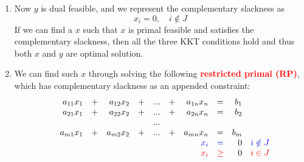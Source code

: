 \documentclass[mathserif]{beamer}
\begin{document}
{\begin{itemize}
\begin{small}
\begin{enumerate}
 \begin{figure}
 \texttt{[image: L9-RP.png]}
\end{figure}
\item Now $y$ is dual feasible, and we represent the complementary slackness as
\[
	x_i = 0, \quad  i \notin J
\]
If we can find a $x$ such that $x$ is primal feasible and satisfies the complementary slackness, then all the three KKT conditions hold and thus both $x$ and $y$ are optimal solution. 
\item We can find such $x$ through solving the following  \textcolor{red}{\bf restricted primal (RP)}, which has  complementary slackness as an appended constraint: 
\[
\begin{array}{rrrrrrrrrrrrl}
      & a_{11}x_1 &+& a_{12}x_2 &+& ... &+& a_{1n}x_n & = & b_1 &  \\
      & a_{21}x_1 &+& a_{22}x_2 &+& ... &+& a_{2n}x_n & = & b_2 & \\
      &           & &           & & ... & &           &      &     &  \\
      & a_{m1}x_1 &+& a_{m2}x_2 &+& ... &+& a_{mn}x_n & = & b_m & \\
      &           & &           & &     & &       \textcolor{blue}{x_i} & \textcolor{blue}{=} & 0   &\textcolor{blue}{ i\notin J} \\
      &           & &           & &     & &       \textcolor{red}{x_i} & \textcolor{red}{\geq} & 0   & \textcolor{red}{i\in J} 
     \end{array} \nonumber
\]
\end{enumerate}
\end{small}
\end{itemize}
} 
\end{document}
